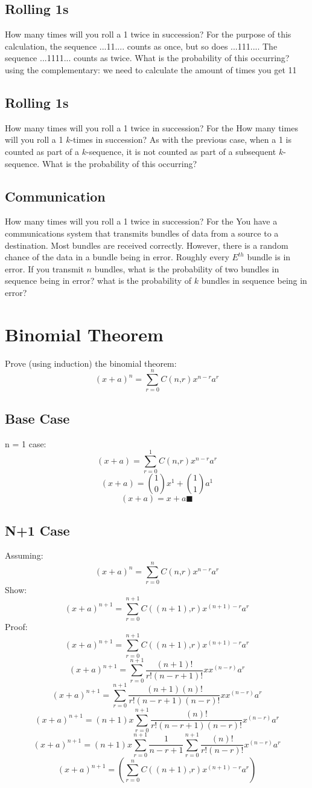 \documentclass[a4paper,12pt]{article}
\begin{document}
\subsection{Rolling 1s}
How many times will you roll a 1 twice in succession?  For the
purpose of this calculation, the sequence ...11.... counts as once,
but so does ...111....  The sequence ...1111... counts as twice.  What
is the probability of this occurring?\\
using the complementary: we need to calculate the amount of times you get 11
\subsection{Rolling 1s}
How many times will you roll a 1 twice in succession?  For the
How many times will you roll a 1 $k$-times in succession?  As with
the previous case, when a 1 is counted as part of a $k$-sequence, it
is not counted as part of a subsequent $k$-sequence.  What
is the probability of this occurring?\\

\subsection{Communication}
How many times will you roll a 1 twice in succession?  For the
You have a communications system that transmits bundles of data
from a source to a destination.  Most bundles are received correctly.
However, there is a random chance of the data in a bundle being in
error.  Roughly every $E^{th}$ bundle is in error.  If you transmit
$n$ bundles, what is the probability of two bundles in sequence being
in error?  what is the probability of $k$ bundles in sequence being in
error?

\section{Binomial Theorem}
Prove (using induction) the binomial theorem:
\[
(x+a)^n = \sum_{r=0}^n C(n‚ r)x^{n-r}a^r
\]
\subsection{Base Case}
n = 1 case:\\
\[(x+a) = \sum_{r=0}^1 C(n‚ r)x^{n-r}a^r\]
\[(x+a) = \binom{1}{0} x^{1} + \binom{1}{1}  a^1\]
\[(x+a) = x+a \blacksquare \]
\subsection{N+1 Case}
Assuming:
\[
(x+a)^n = \sum_{r=0}^n C(n‚ r)x^{n-r}a^r
\]
Show:
\[(x+a)^{n+1} = \sum_{r=0}^{n+1} C((n+1)‚ r)x^{(n+1)-r}a^r\]
Proof:
\[(x+a)^{n+1} = \sum_{r=0}^{n+1} C((n+1)‚ r)x^{(n+1)-r}a^r\]
\[(x+a)^{n+1} = \sum_{r=0}^{n+1} \frac{(n+1)!}{r!(n-r+1)!}xx^{(n-r)}a^r\]
\[(x+a)^{n+1} = \sum_{r=0}^{n+1} \frac{(n+1)(n)!}{r!(n-r+1)(n-r)!}xx^{(n-r)}a^r\]
\[(x+a)^{n+1} = (n+1)x \sum_{r=0}^{n+1} \frac{(n)!}{r!(n-r+1)(n-r)!}x^{(n-r)}a^r\]
\[(x+a)^{n+1} = (n+1)x \sum_{r=0}^{n+1} \frac{1}{n-r+1} \sum_{r=0}^{n+1} \frac{(n)!}{r!(n-r)!}x^{(n-r)}a^r\]
\[(x+a)^{n+1} = (\sum_{r=0}^{n} C((n+1)‚ r)x^{(n+1)-r}a^r) \]
\end{document}
